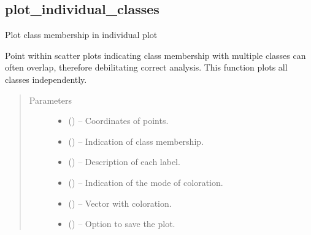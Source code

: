 \documentclass[letterpaper,10pt,english]{sphinxmanual}
\begin{document}
\subsection{plot\_individual\_classes}
\label{\detokenize{api/ucf.plot_individual_classes:plot-individual-classes}}\label{\detokenize{api/ucf.plot_individual_classes::doc}}

\begin{fulllineitems}
\label{\detokenize{api/ucf.plot_individual_classes:ucf.plot_individual_classes}}
Plot class membership in individual plot

Point within scatter plots indicating class membership with multiple
classes can often overlap, therefore debilitating correct analysis. This
function plots all classes independently.
\begin{quote}\begin{description}
\item[{Parameters}] \leavevmode\begin{itemize}
\item {} 
 () -- Coordinates of points.

\item {} 
 () -- Indication of class membership.

\item {} 
 () -- Description of each label.

\item {} 
 () -- Indication of the mode of coloration.

\item {} 
 () -- Vector with coloration.

\item {} 
 () -- Option to save the plot.


\end{itemize}
\end{description}
\end{quote}
\end{fulllineitems}
\end{document}
